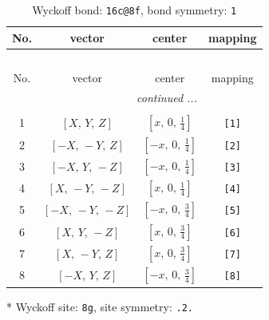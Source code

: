 \documentclass[fleqn,8pt]{jsarticle}
\begin{document}
\renewcommand{\arraystretch}{1.2}
\begin{longtable}{cccc}
\caption{Wyckoff bond: {\tt 16c@8f}, bond symmetry: {\tt 1}}
 \\
 \hline \hline
No. & vector & center & mapping \\ \hline \endfirsthead

\multicolumn{3}{l}{\tablename\ \thetable{}} \\
 \hline \hline
No. & vector & center & mapping \\ \hline \endhead

 \hline \hline
\multicolumn{3}{r}{\footnotesize\it continued ...} \\ \endfoot

 \hline \hline
\multicolumn{3}{r}{} \\ \endlastfoot

1 & $\left[ X,\, Y,\, Z \right]$ & $\left[ x,\, 0,\, \frac{1}{4} \right]$ & {\tt [1]} \\ \hline
2 & $\left[ - X,\, - Y,\, Z \right]$ & $\left[ - x,\, 0,\, \frac{1}{4} \right]$ & {\tt [2]} \\ \hline
3 & $\left[ - X,\, Y,\, - Z \right]$ & $\left[ - x,\, 0,\, \frac{1}{4} \right]$ & {\tt [3]} \\ \hline
4 & $\left[ X,\, - Y,\, - Z \right]$ & $\left[ x,\, 0,\, \frac{1}{4} \right]$ & {\tt [4]} \\ \hline
5 & $\left[ - X,\, - Y,\, - Z \right]$ & $\left[ - x,\, 0,\, \frac{3}{4} \right]$ & {\tt [5]} \\ \hline
6 & $\left[ X,\, Y,\, - Z \right]$ & $\left[ x,\, 0,\, \frac{3}{4} \right]$ & {\tt [6]} \\ \hline
7 & $\left[ X,\, - Y,\, Z \right]$ & $\left[ x,\, 0,\, \frac{3}{4} \right]$ & {\tt [7]} \\ \hline
8 & $\left[ - X,\, Y,\, Z \right]$ & $\left[ - x,\, 0,\, \frac{3}{4} \right]$ & {\tt [8]} \\
\end{longtable}
* Wyckoff site: {\tt 8g}, site symmetry: {\tt .2.}
\renewcommand{\arraystretch}{1.2}
\end{document}
